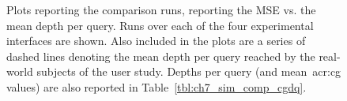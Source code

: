 \begin{figure}[p!]
    \centering
    \caption[Real-world comparisons over stopping strategies]{Plots reporting the comparison runs, reporting the MSE vs. the mean depth per query. Runs over each of the four experimental interfaces are shown. Also included in the plots are a series of dashed lines denoting the mean depth per query reached by the real-world subjects of the user study. Depths per query (and mean~\gls{acr:cg} values) are also reported in Table~\ref{tbl:ch7_sim_comp_cgdq}.}
    \label{fig:ch7_sim_comparison_plots}
\end{figure}


